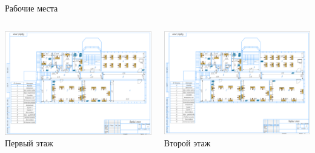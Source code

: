 \documentclass[aspectratio=169]{beamer}
\begin{document}
\begin{frame}{Рабочие места}
	\begin{columns}[T]
		\begin{column}{0.48\textwidth}
			\centering
			\includegraphics[width=\linewidth]{images/Схема по курсовому(1 этаж).png}
			\text Первый этаж
		\end{column}
		
		\begin{column}{0.48\textwidth}
			\centering
			\includegraphics[width=\linewidth]{images/Схема по курсовому(2 этаж).png}
			\text Второй этаж
		\end{column}
	\end{columns}
\end{frame}
\end{document}

